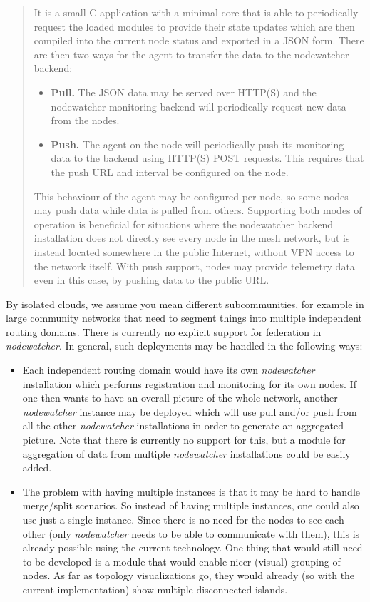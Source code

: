 \documentclass[12pt,twoside,a4paper]{report}
\newcommand{\nodewatcher}{\textit{nodewatcher}}
\begin{document}
\begin{quote}
It is a small C application with a minimal core that is able to periodically request the loaded modules to provide their state updates which are then compiled into the current node status and exported in a JSON form.
There are then two ways for the agent to transfer the data to the nodewatcher backend:
\begin{itemize}
    \item \textbf{Pull.} The JSON data may be served over HTTP(S) and the nodewatcher monitoring backend will periodically request new data from the nodes.

    \item \textbf{Push.} The agent on the node will periodically push its monitoring data to the backend using HTTP(S) POST requests. This requires that the push URL and interval be configured on the node.
\end{itemize}

This behaviour of the agent may be configured per-node, so some nodes may push data while data is pulled from others.
Supporting both modes of operation is beneficial for situations where the nodewatcher backend installation does not directly see every node in the mesh network, but is instead located somewhere in the public Internet, without VPN access to the network itself.
With push support, nodes may provide telemetry data even in this case, by pushing data to the public URL.
\end{quote}

By isolated clouds, we assume you mean different subcommunities, for example in large community networks that need to segment things into multiple independent routing domains.
There is currently no explicit support for federation in \nodewatcher{}.
In general, such deployments may be handled in the following ways:
\begin{itemize}
    \item Each independent routing domain would have its own \nodewatcher{} installation which performs registration and monitoring for its own nodes.
    If one then wants to have an overall picture of the whole network, another \nodewatcher{} instance may be deployed which will use pull and/or push from all the other \nodewatcher{} installations in order to generate an aggregated picture.
    Note that there is currently no support for this, but a module for aggregation of data from multiple \nodewatcher{} installations could be easily added.

    \item The problem with having multiple instances is that it may be hard to handle merge/split scenarios.
    So instead of having multiple instances, one could also use just a single instance.
    Since there is no need for the nodes to see each other (only \nodewatcher{} needs to be able to communicate with them), this is already possible using the current technology.
    One thing that would still need to be developed is a module that would enable nicer (visual) grouping of nodes.
    As far as topology visualizations go, they would already (so with the current implementation) show multiple disconnected islands.
\end{itemize}
\end{document}
